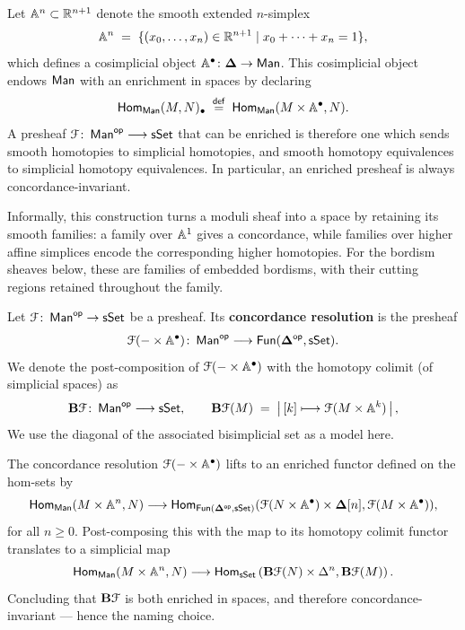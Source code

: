 Let $\AA^n\subset\RR^{n+1}$ denote the smooth extended $n$-simplex
\begin{equation}
  \AA^n
  \;=\;
  \{(x_0,\dots,x_n)\in\RR^{n+1}\mid x_0+\cdots+x_n=1\},
\end{equation}
which defines a cosimplicial object $\AA^\bullet\maps\bDelta\to\man$. This cosimplicial object endows $\man$ with an enrichment in spaces by declaring 
\begin{equation}
    \Hom_{\man}(M,N)_{\bullet} \; \overset{\sf def}{=} \; \Hom_{\man}(M \times \AA^{\bullet}, N).
\end{equation}
A presheaf $\cF\maps \man^{\op} \longra \sset$ that can be enriched is therefore one which sends smooth homotopies to simplicial homotopies, and smooth homotopy equivalences to simplicial homotopy equivalences. In particular, an enriched presheaf is always concordance-invariant.

Informally, this construction turns a moduli sheaf into a space by retaining
its smooth families: a family over $\AA^1$ gives a concordance, while families
over higher affine simplices encode the corresponding higher homotopies.
For the bordism sheaves below, these are families of embedded bordisms, with
their cutting regions retained throughout the family.

\begin{definition}\label{ch3:: def: concordance-resolution}
  {\cite[Definition~2.5]{BBEP24}}
  Let $\cF\maps\man^{\op}\to\sset$ be a presheaf. Its \textbf{concordance
  resolution} is the presheaf
  \begin{equation}
    \cF(-\times \AA^{\bullet})\maps \man^{\op} \longra \fun(\bDelta^{\op},\sset).
  \end{equation}
  We denote the post-composition of $\cF(-\times \AA^\bullet)$ with the homotopy colimit (of simplicial spaces) as
  \begin{equation}
    \mathbf{B}\cF\maps\man^{\op}\longra\sset,\qquad
    \mathbf{B}\cF(M)\;=\;
    \left\vert\,[k]\longmapsto\cF(M\times \AA^k)\,\right\vert,
  \end{equation}
   We use the diagonal of the associated bisimplicial set as a model here.
\end{definition}


\begin{remark}
    The concordance resolution $\cF(-\times \AA^\bullet)$ lifts to an enriched functor defined on the hom-sets by 
    \begin{equation}
        \Hom_{\man}(M \times \AA^{n}, N) \longra \Hom_{\fun(\bDelta^\op,\sset)}(\cF(N \times \AA^{\bullet})\times \bDelta[n], \cF(M \times \AA^{\bullet})),
    \end{equation}
    for all $n\geq 0$. Post-composing this with the map to its homotopy colimit functor translates to a simplicial map
    \begin{equation}
        \Hom_{\man}(M \times \AA^{n}, N) \longra \Hom_{\sset}\left(\bB\cF(N)\times \Delta^n, \bB\cF(M )\right).
    \end{equation}
    Concluding that $\bB\cF$ is both enriched in spaces, and therefore concordance-invariant — hence the naming choice.
\end{remark}

